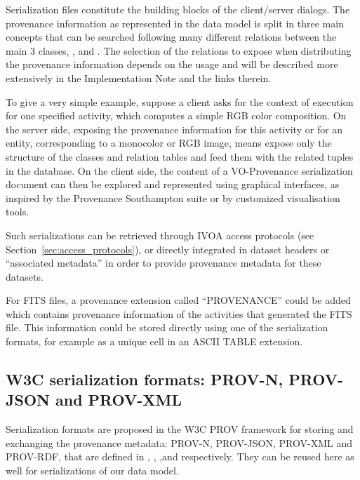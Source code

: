 
Serialization files constitute the building blocks of the client/server dialogs.
The provenance information as represented in the data model is split in three main concepts that can be searched following many different relations between the main 3 classes, ,  and .
The selection of the relations to expose when distributing the provenance information depends on the usage and will be described more extensively in the Implementation Note \citep{std:ProvenanceImplementationNote} and the links therein.

To give a very simple example, suppose a client asks for the context of execution for one specified activity, which computes a simple RGB color composition. 
On the server side, exposing the provenance information for this activity or for an entity, corresponding to a monocolor or RGB image, 
means expose only the structure of the classes
and relation tables and feed them with the related tuples in the database.
On the client side, the content of a VO-Provenance serialization document can then be explored and represented using graphical interfaces, as inspired by the Provenance Southampton suite or by customized visualisation tools.

Such serializations can be retrieved through IVOA access protocols (see Section~\ref{sec:access_protocols}), %
or directly integrated in dataset headers or ``associated metadata'' in order to provide provenance metadata for these datasets. 

For FITS files, a provenance extension called ``PROVENANCE'' could be added which contains provenance information of the activities that generated the FITS file. This information could be stored directly using one of the serialization formats, for example as a unique cell in an ASCII TABLE extension.




\subsection{W3C serialization formats: PROV-N, PROV-JSON and PROV-XML}

Serialization formats are proposed in the W3C PROV framework for storing and exchanging the provenance metadata: {PROV-N}, {PROV-JSON}, {PROV-XML} and PROV-RDF, that are defined in \cite{std:PROV-N}, \cite{std:PROV-JSON}, \cite{std:PROV-XML},and \cite{std:PROV-O} respectively.
They can be reused here as well for serializations of our data model. 

